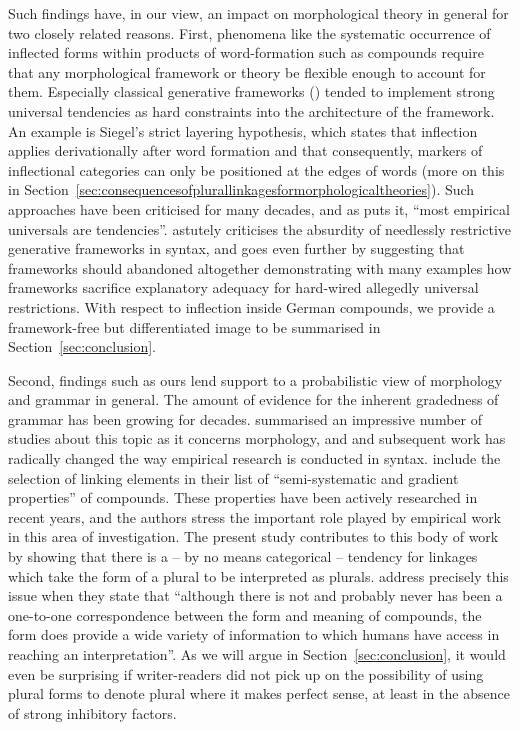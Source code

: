 Such findings have, in our view, an impact on morphological theory in general for two closely related reasons.
First, phenomena like the systematic occurrence of inflected forms within products of word-formation such as compounds require that any morphological framework or theory be flexible enough to account for them.
Especially classical generative frameworks (\egg \citealt{Siegel1979,Mohanan1986,Anderson1992,Pinker1999}) tended to implement strong universal tendencies as hard constraints into the architecture of the framework.
An example is Siegel's strict layering hypothesis, which states that inflection applies derivationally after word formation and that consequently, markers of inflectional categories can only be positioned at the edges of words (more on this in Section~\ref{sec:consequencesofplurallinkagesformorphologicaltheories}).
Such approaches have been criticised for many decades, and as \textcite[391]{Haspelmath2010} puts it, ``most empirical universals are tendencies''.
\textcite{Pollard1996} astutely criticises the absurdity of needlessly restrictive generative frameworks in syntax, and \textcite{Haspelmath2010} goes even further by suggesting that frameworks should abandoned altogether demonstrating with many examples how frameworks sacrifice explanatory adequacy for hard-wired allegedly universal restrictions.
With respect to inflection inside German compounds, we provide a framework-free but differentiated image to be summarised in Section~\ref{sec:conclusion}.

Second, findings such as ours lend support to a probabilistic view of morphology and grammar in general.
The amount of evidence for the inherent gradedness of grammar has been growing for decades.
\textcite{HayBaayen2005} summarised an impressive number of studies about this topic as it concerns morphology, and \textcite{Bresnan2007} and subsequent work has radically changed the way empirical research is conducted in syntax.
\textcite[105]{ArndtlappeEa2016} include the selection of linking elements in their list of ``semi-systematic and gradient properties'' of compounds.
These properties have been actively researched in recent years, and the authors stress the important role played by empirical work in this area of investigation.
The present study contributes to this body of work by showing that there is a -- by no means categorical -- tendency for linkages which take the form of a plural to be interpreted as plurals.
\textcite[107]{ArndtlappeEa2016} address precisely this issue when they state that ``although there is not and probably never has been a one-to-one correspondence between the form and meaning of compounds, the form does provide a wide variety of information to which humans have access in reaching an interpretation''.
As we will argue in Section~\ref{sec:conclusion}, it would even be surprising if writer-readers did not pick up on the possibility of using plural forms to denote plural where it makes perfect sense, at least in the absence of strong inhibitory factors.

